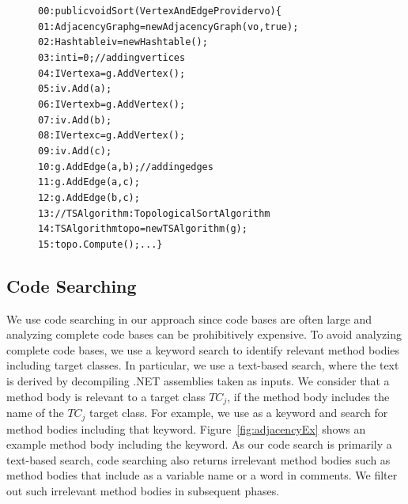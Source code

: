 \documentclass{sig-alternate}
\begin{document}
\begin{figure}[t]
\begin{CodeOut}
\begin{alltt}
00:public void Sort(VertexAndEdgeProvider vo) \{
01:\hspace*{0.1in}AdjacencyGraph g = new AdjacencyGraph(vo, true);
02:\hspace*{0.1in}Hashtable iv = new Hashtable();			
03:\hspace*{0.1in}int i = 0;  //adding vertices
04:\hspace*{0.1in}IVertex a = g.AddVertex();
05:\hspace*{0.1in}iv.Add(a);
06:\hspace*{0.1in}IVertex b = g.AddVertex();
07:\hspace*{0.1in}iv.Add(b);
08:\hspace*{0.1in}IVertex c = g.AddVertex();
09:\hspace*{0.1in}iv.Add(c);
10:\hspace*{0.1in}g.AddEdge(a,b);	//adding edges
11:\hspace*{0.1in}g.AddEdge(a,c);
12:\hspace*{0.1in}g.AddEdge(b,c);
13:\hspace*{0.1in}//TSAlgorithm: TopologicalSortAlgorithm
14:\hspace*{0.1in}TSAlgorithm topo = new TSAlgorithm(g);
15:\hspace*{0.1in}topo.Compute(); ... \}
\end{alltt}
\end{CodeOut}\vspace*{-4ex}
\vspace*{-4ex}
\end{figure}

\subsection{Code Searching} 

We use code searching in our approach since code bases are often large and analyzing complete code bases can be prohibitively expensive. To avoid analyzing complete code bases, we use a keyword search to identify relevant method bodies including target classes. In particular, we use a text-based search, where the text is derived by decompiling .NET assemblies taken as inputs. We consider that a method body is relevant to a target class $TC_j$, if the method body includes the name of the $TC_j$ target class. For example, we use  as a keyword and search for method bodies including that keyword. Figure~\ref{fig:adjacencyEx} shows an example method body including the  keyword. As our code search is primarily a text-based search, code searching also returns irrelevant method bodies such as method bodies that include  as a variable name or a word in comments. We filter out such irrelevant method bodies in subsequent phases. 
\end{document}

